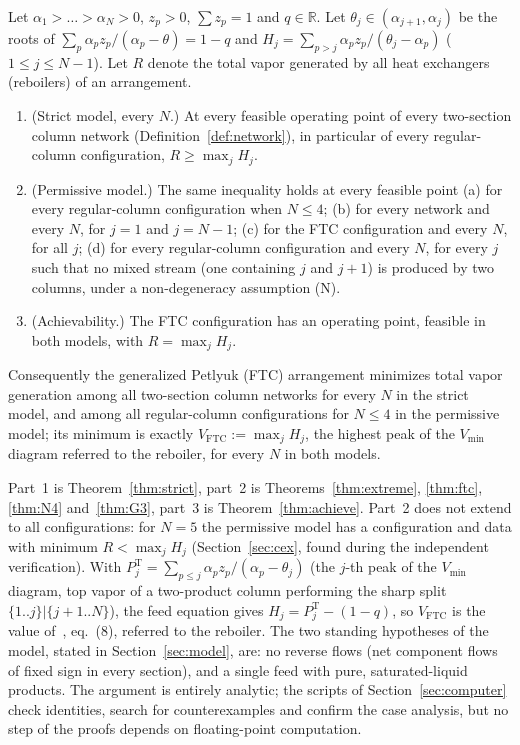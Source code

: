 \documentclass[11pt,a4paper]{report}
\newcommand{\VFTC}{V_{\mathrm{FTC}}}
\begin{document}
\begin{theorem}\label{thm:summary}
Let $\alpha_1>\dots>\alpha_N>0$, $z_p>0$, $\sum z_p=1$ and $q\in\mathbb R$. Let $\theta_j\in(\alpha_{j+1},\alpha_j)$ be the
roots of $\sum_p\alpha_pz_p/(\alpha_p-\theta)=1-q$ and $H_j=\sum_{p>j}\alpha_pz_p/(\theta_j-\alpha_p)$ ($1\le j\le N-1$).
Let $R$ denote the total vapor generated by all heat exchangers (reboilers) of an arrangement.
\begin{enumerate}
\item (Strict model, every $N$.) At every feasible operating point of every two-section column network
(Definition~\ref{def:network}), in particular of every regular-column configuration, $R\ge\max_j H_j$.
\item (Permissive model.) The same inequality holds at every feasible point (a) for every regular-column configuration
when $N\le4$; (b) for every network and every $N$, for $j=1$ and $j=N-1$; (c) for the FTC configuration and every $N$,
for all $j$; (d) for every regular-column configuration and every $N$, for every $j$ such that no mixed stream
(one containing $j$ and $j+1$) is produced by two columns, under a non-degeneracy assumption (N).
\item (Achievability.) The FTC configuration has an operating point, feasible in both models, with $R=\max_jH_j$.
\end{enumerate}
Consequently the generalized Petlyuk (FTC) arrangement minimizes total vapor generation among all two-section column
networks for every $N$ in the strict model, and among all regular-column configurations for $N\le4$ in the permissive
model; its minimum is exactly $\VFTC:=\max_jH_j$, the highest peak of the $V_{\min}$ diagram referred to the reboiler,
for every $N$ in both models.
\end{theorem}

Part~1 is Theorem~\ref{thm:strict}, part~2 is Theorems~\ref{thm:extreme}, \ref{thm:ftc}, \ref{thm:N4} and~\ref{thm:G3}, part~3 is
Theorem~\ref{thm:achieve}. Part~2 does not extend to all configurations: for $N=5$ the permissive model has a
configuration and data with minimum $R<\max_jH_j$ (Section~\ref{sec:cex}, found during the independent
verification). With $P_j^{\mathrm T}=\sum_{p\le j}\alpha_pz_p/(\alpha_p-\theta_j)$ (the $j$-th peak of the
$V_{\min}$ diagram, top vapor of a two-product column performing the sharp split $\{1..j\}|\{j+1..N\}$), the feed
equation gives $H_j=P_j^{\mathrm T}-(1-q)$, so $\VFTC$ is the value of~\autocite{HS3}, eq.~(8), referred to the
reboiler. The two standing hypotheses of the model, stated in Section~\ref{sec:model}, are: no reverse flows (net
component flows of fixed sign in every section), and a single feed with pure, saturated-liquid products. The argument
is entirely analytic; the scripts of Section~\ref{sec:computer} check identities, search for counterexamples and
confirm the case analysis, but no step of the proofs depends on floating-point computation.
\end{document}
